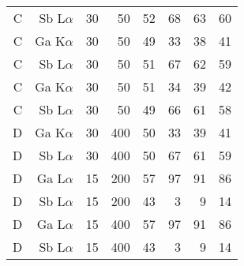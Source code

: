 \begin{table}[phtb]
\begin{center}
\begin{tabular}{rrrrrrrr}
            C               & Sb L$\alpha$  & 30             & 50             & 52                        & 68                     & 63                     & 60                     \\
            C               & Ga K$\alpha$  & 30             & 50             & 49                        & 33                     & 38                     & 41                     \\
            C               & Sb L$\alpha$  & 30             & 50             & 51                        & 67                     & 62                     & 59                     \\
            C               & Ga K$\alpha$  & 30             & 50             & 51                        & 34                     & 39                     & 42                     \\
            C               & Sb L$\alpha$  & 30             & 50             & 49                        & 66                     & 61                     & 58                     \\
            \hline
            D               & Ga K$\alpha$  & 30             & 400            & 50                        & 33                     & 39                     & 41                     \\
            D               & Sb L$\alpha$  & 30             & 400            & 50                        & 67                     & 61                     & 59                     \\
            D               & Ga L$\alpha$  & 15             & 200            & 57                        & 97                     & 91                     & 86                     \\
            D               & Sb L$\alpha$  & 15             & 200            & 43                        & 3                      & 9                      & 14                     \\
            D               & Ga L$\alpha$  & 15             & 400            & 57                        & 97                     & 91                     & 86                     \\
            D               & Sb L$\alpha$  & 15             & 400            & 43                        & 3                      & 9                      & 14                     \\
            \hline
        \end{tabular}
    \end{center}
\end{table}
\restoregeometry %
